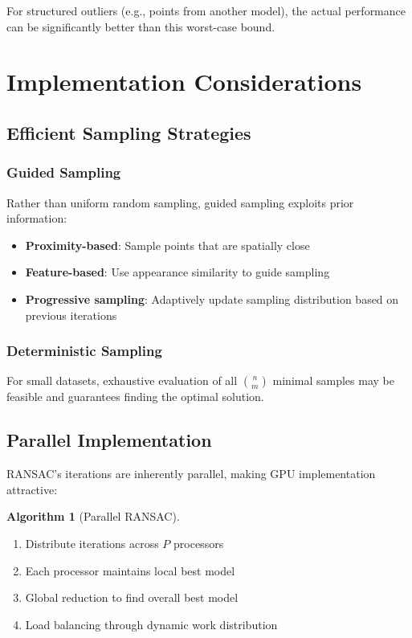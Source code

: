 \documentclass[12pt]{article}
\theoremstyle{definition}
\newtheorem{algorithm}{Algorithm}[section]
\begin{document}
For structured outliers (e.g., points from another model), the actual performance can be significantly better than this worst-case bound.

\newpage
\section{Implementation Considerations}

\subsection{Efficient Sampling Strategies}

\subsubsection{Guided Sampling}
Rather than uniform random sampling, guided sampling exploits prior information:
\begin{itemize}
    \item \textbf{Proximity-based}: Sample points that are spatially close
    \item \textbf{Feature-based}: Use appearance similarity to guide sampling
    \item \textbf{Progressive sampling}: Adaptively update sampling distribution based on previous iterations
\end{itemize}

\subsubsection{Deterministic Sampling}
For small datasets, exhaustive evaluation of all $\binom{n}{m}$ minimal samples may be feasible and guarantees finding the optimal solution.

\subsection{Parallel Implementation}

RANSAC's iterations are inherently parallel, making GPU implementation attractive:

\begin{algorithm}[Parallel RANSAC]
    \begin{enumerate}
        \item Distribute iterations across $P$ processors
        \item Each processor maintains local best model
        \item Global reduction to find overall best model
        \item Load balancing through dynamic work distribution
    \end{enumerate}
\end{algorithm}
\end{document}
